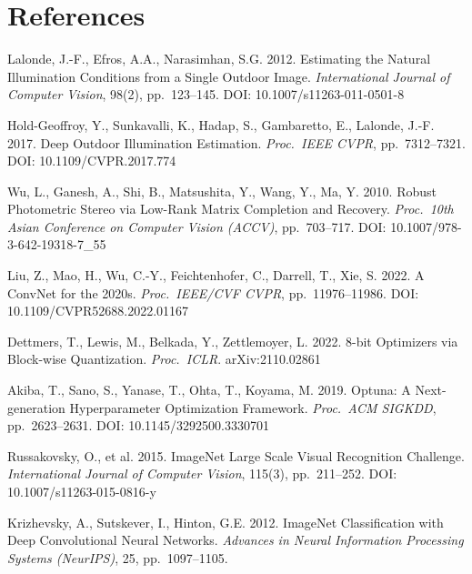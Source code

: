 \documentclass[9pt, a4paper, twocolumn]{article}
\begin{document}
\section*{References}
\begin{sloppypar}
\begin{enumerate}[label={[\arabic*]}, leftmargin=*, itemsep=2pt, parsep=0pt, font=\small]

\item Lalonde, J.-F., Efros, A.A., Narasimhan, S.G. 2012. Estimating the Natural Illumination Conditions from a Single Outdoor Image. \textit{International Journal of Computer Vision}, 98(2), pp.~123--145. DOI: 10.1007/s11263-011-0501-8

\item Hold-Geoffroy, Y., Sunkavalli, K., Hadap, S., Gambaretto, E., Lalonde, J.-F. 2017. Deep Outdoor Illumination Estimation. \textit{Proc.\ IEEE CVPR}, pp.~7312--7321. DOI: 10.1109/CVPR.2017.774

\item Wu, L., Ganesh, A., Shi, B., Matsushita, Y., Wang, Y., Ma, Y. 2010. Robust Photometric Stereo via Low-Rank Matrix Completion and Recovery. \textit{Proc.\ 10th Asian Conference on Computer Vision (ACCV)}, pp.~703--717. DOI: 10.1007/978-3-642-19318-7\_55

\item Liu, Z., Mao, H., Wu, C.-Y., Feichtenhofer, C., Darrell, T., Xie, S. 2022. A ConvNet for the 2020s. \textit{Proc.\ IEEE/CVF CVPR}, pp.~11976--11986. DOI: 10.1109/CVPR52688.2022.01167

\item Dettmers, T., Lewis, M., Belkada, Y., Zettlemoyer, L. 2022. 8-bit Optimizers via Block-wise Quantization. \textit{Proc.\ ICLR}. arXiv:2110.02861

\item Akiba, T., Sano, S., Yanase, T., Ohta, T., Koyama, M. 2019. Optuna: A Next-generation Hyperparameter Optimization Framework. \textit{Proc.\ ACM SIGKDD}, pp.~2623--2631. DOI: 10.1145/3292500.3330701

\item Russakovsky, O., et al. 2015. ImageNet Large Scale Visual Recognition Challenge. \textit{International Journal of Computer Vision}, 115(3), pp.~211--252. DOI: 10.1007/s11263-015-0816-y

\item Krizhevsky, A., Sutskever, I., Hinton, G.E. 2012. ImageNet Classification with Deep Convolutional Neural Networks. \textit{Advances in Neural Information Processing Systems (NeurIPS)}, 25, pp.~1097--1105.


\end{enumerate}
\end{sloppypar}
\end{document}

